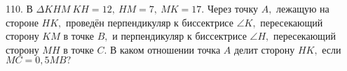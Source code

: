 110. В $\Delta KHM\ KH=12,\ HM=7,\ MK=17.$ Через точку $A,$ лежащую на стороне $HK,$ проведён перпендикуляр к биссектрисе $\angle K,$ пересекающий сторону $KM$ в точке $B,$ и перпендикуляр к биссектрисе $\angle H,$ пересекающий сторону $MH$ в точке $C.$ В каком отношении точка $A$ делит сторону $HK,$ если $MC=0,5MB?$\\

